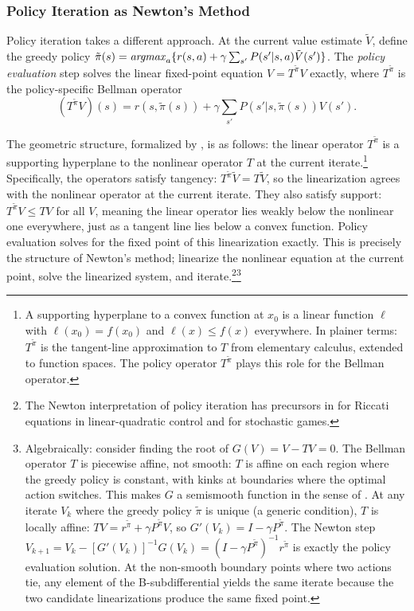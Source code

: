 \subsubsection{Policy Iteration as Newton's Method}

Policy iteration takes a different approach. At the current value estimate $\tilde{V}$, define the greedy policy $\tilde{\pi}(s) = \mathop{\it argmax}_a \{ r(s,a) + \gamma \sum_{s'} P(s'|s,a) \tilde{V}(s') \}$. The \emph{policy evaluation} step solves the linear fixed-point equation $V = T^{\tilde{\pi}} V$ exactly, where $T^{\tilde{\pi}}$ is the policy-specific Bellman operator
\begin{equation}
(T^{\tilde{\pi}} V)(s) = r(s, \tilde{\pi}(s)) + \gamma \sum_{s'} P(s'|s,\tilde{\pi}(s)) V(s').
\end{equation}

The geometric structure, formalized by \citet{puterman1979}, is as follows: the linear operator $T^{\tilde{\pi}}$ is a supporting hyperplane to the nonlinear operator $T$ at the current iterate.\footnote{A supporting hyperplane to a convex function at $x_0$ is a linear function $\ell$ with $\ell(x_0) = f(x_0)$ and $\ell(x) \leq f(x)$ everywhere. In plainer terms: $T^{\tilde{\pi}}$ is the tangent-line approximation to $T$ from elementary calculus, extended to function spaces. The policy operator $T^{\tilde{\pi}}$ plays this role for the Bellman operator.} Specifically, the operators satisfy tangency: $T^{\tilde{\pi}} \tilde{V} = T\tilde{V}$, so the linearization agrees with the nonlinear operator at the current iterate. They also satisfy support: $T^{\tilde{\pi}} V \leq TV$ for all $V$, meaning the linear operator lies weakly below the nonlinear one everywhere, just as a tangent line lies below a convex function. Policy evaluation solves for the fixed point of this linearization exactly. This is precisely the structure of Newton's method; linearize the nonlinear equation at the current point, solve the linearized system, and iterate.\footnote{The Newton interpretation of policy iteration has precursors in \citet{kleinman1968} for Riccati equations in linear-quadratic control and \citet{pollatschek1969} for stochastic games.}\footnote{Algebraically: consider finding the root of $G(V) = V - TV = 0$. The Bellman operator $T$ is piecewise affine, not smooth: $T$ is affine on each region where the greedy policy is constant, with kinks at boundaries where the optimal action switches. This makes $G$ a semismooth function in the sense of \citet{qi1993}. At any iterate $V_k$ where the greedy policy $\tilde{\pi}$ is unique (a generic condition), $T$ is locally affine: $TV = r^{\tilde{\pi}} + \gamma P^{\tilde{\pi}} V$, so $G'(V_k) = I - \gamma P^{\tilde{\pi}}$. The Newton step $V_{k+1} = V_k - [G'(V_k)]^{-1} G(V_k) = (I - \gamma P^{\tilde{\pi}})^{-1} r^{\tilde{\pi}}$ is exactly the policy evaluation solution. At the non-smooth boundary points where two actions tie, any element of the B-subdifferential yields the same iterate because the two candidate linearizations produce the same fixed point.}

